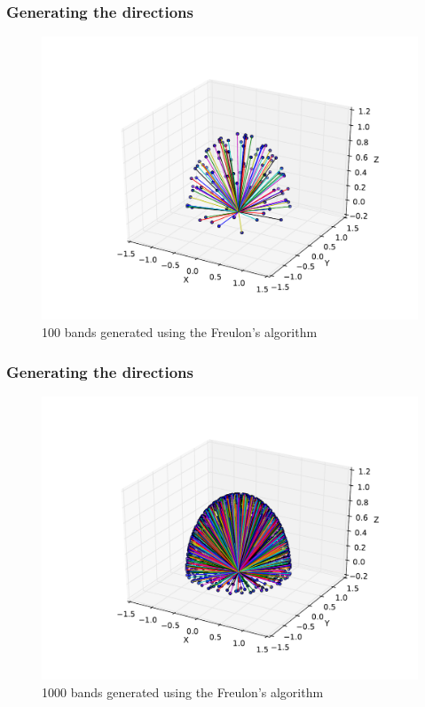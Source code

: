 \documentclass{beamer}
\begin{document}
\begin{frame}
\frametitle{Generating the directions}
\begin{figure}
\begin{center}
\includegraphics[height=0.7\textheight]{freulon_algo_100_bands.pdf}
\end{center}
\caption{100 bands generated using the Freulon's algorithm}
\label{fig:freulon_algo_100_bands}
\end{figure}
\end{frame}


\begin{frame}
\frametitle{Generating the directions}
\begin{figure}
\begin{center}
\includegraphics[height=0.7\textheight]{freulon_algo_1000_bands.pdf}
\end{center}
\caption{1000 bands generated using the Freulon's algorithm}
\label{fig:freulon_algo_1000_bands}
\end{figure}
\end{frame}
\end{document}
